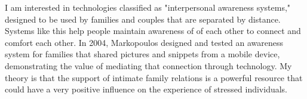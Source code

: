    I am interested in technologies classified as "interpersonal awareness systems,"
    designed to be used by families and couples that are separated by distance.
    Systems like this help people maintain awareness of  of each other to connect
    and comfort each other. \cite{neustaedter06}
    In 2004, Markopoulos designed and tested an
    awareness system for families that shared pictures and snippets from a mobile
    device, demonstrating the value of mediating that connection through technology.
    \cite{markopoulos04}
    My theory is that the support of intimate family relations is a powerful
    resource that could
    have a very positive influence on the experience of stressed individuals.
